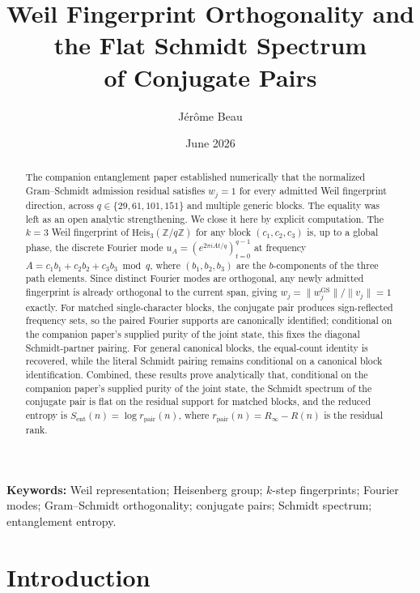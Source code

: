 \documentclass[11pt]{article}
\title{Weil Fingerprint Orthogonality and the Flat Schmidt Spectrum\\
of Conjugate Pairs}
\author{J\'er\^ome Beau}
\date{June 2026}
\newcommand{\Heis}{\mathrm{Heis}}
\newcommand{\Sent}{S_{\mathrm{ent}}}
\newcommand{\rpair}{r_{\mathrm{pair}}}
\newcommand{\ue}{\hat{u}}
\begin{document}
  \maketitle

  \begin{abstract}
    The companion entanglement paper established numerically that the normalized
    Gram--Schmidt admission residual satisfies $w_j=1$ for every admitted Weil fingerprint
    direction, across $q\in\{29,61,101,151\}$ and multiple generic blocks.
    The equality was left as an open analytic strengthening.
    We close it here by explicit computation.
    The $k{=}3$ Weil fingerprint of $\Heis_3(\mathbb{Z}/q\mathbb{Z})$ for any block
    $(c_1,c_2,c_3)$ is, up to a global phase, the discrete Fourier mode
    $\ue_A = (e^{2\pi iAt/q})_{t=0}^{q-1}$ at frequency
    $A = c_1b_1+c_2b_2+c_3b_3 \bmod q$,
    where $(b_1,b_2,b_3)$ are the $b$-components of the three path elements.
    Since distinct Fourier modes are orthogonal, any newly admitted fingerprint is already
    orthogonal to the current span, giving $w_j = \|w^{\mathrm{GS}}_j\|/\|v_j\| = 1$ exactly.
    For matched single-character blocks, the conjugate pair produces sign-reflected
    frequency sets, so the paired Fourier supports are canonically identified; conditional
    on the companion paper's supplied purity of the joint state, this fixes the diagonal
    Schmidt-partner pairing.
    For general canonical blocks, the equal-count identity is recovered, while the
    literal Schmidt pairing remains conditional on a canonical block identification.
    Combined, these results prove analytically that, conditional on the companion paper's
    supplied purity of the joint state, the Schmidt spectrum of the conjugate pair is flat
    on the residual support for matched blocks, and the reduced entropy is
    $\Sent(n)=\log\rpair(n)$, where $\rpair(n)=R_\infty-R(n)$ is the residual rank.
  \end{abstract}

  \noindent\textbf{Keywords:}
  Weil representation;
  Heisenberg group;
  $k$-step fingerprints;
  Fourier modes;
  Gram--Schmidt orthogonality;
  conjugate pairs;
  Schmidt spectrum;
  entanglement entropy.

  \newpage
  \tableofcontents

  \newpage
  \section{Introduction}
    \label{sec:intro}
\end{document}
